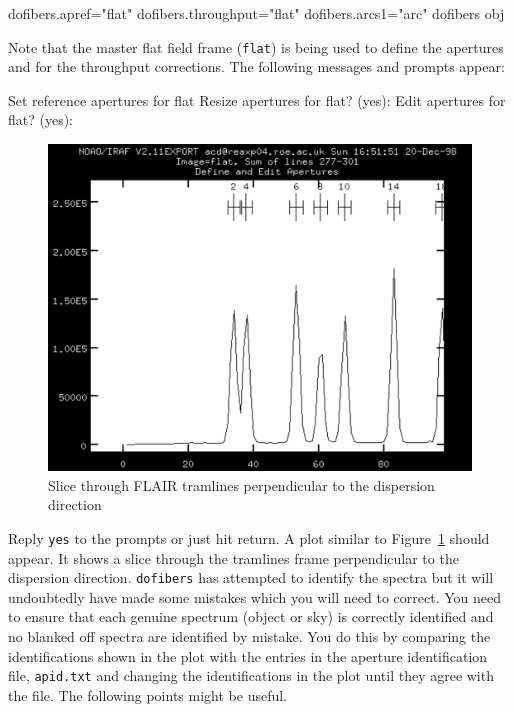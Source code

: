 \documentclass[twoside,11pt]{starlink}
\begin{document}
\begin{enumerate}
\begin{terminalv}
dofibers.apref="flat"
dofibers.throughput="flat"
dofibers.arcs1="arc" 
dofibers  obj
\end{terminalv}

   Note that the master flat field frame (\texttt{flat}) is being used to
   define the apertures and for the throughput corrections.  The following
   messages and prompts appear:

\begin{terminalv}
Set reference apertures for flat
Resize apertures for flat?  (yes):
Edit apertures for flat?  (yes):
\end{terminalv}

  \begin{figure}[htbp]
     \centering
     \includegraphics[totalheight=4in]{sc14_flair_tram}
     \caption{Slice through FLAIR tramlines perpendicular to the
      dispersion direction
     \label{FLAIR_TRAM} }
  \end{figure}

   Reply \texttt{yes} to the prompts or just hit return.  A plot similar
   to Figure~\ref{FLAIR_TRAM} should appear.  It shows a slice through
   the tramlines frame perpendicular to the dispersion direction.  \texttt{dofibers} has attempted to identify the spectra but it will
   undoubtedly have made some mistakes which you will need to correct.
   You need to ensure that each genuine spectrum (object or sky) is
   correctly identified and no blanked off spectra are identified by
   mistake.  You do this by comparing the identifications shown in the
   plot with the entries in the aperture identification file, \texttt{apid.txt} and changing the identifications in the plot until they
   agree with the file.  The following points might be useful.


\end{enumerate}
\end{document}
